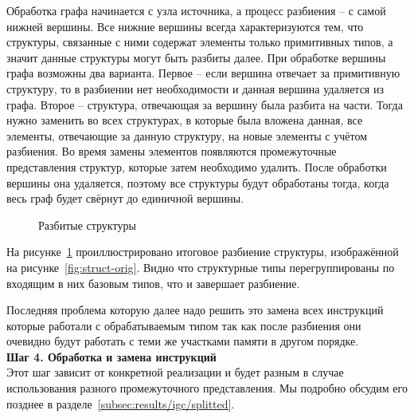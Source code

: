 Обработка графа начинается с узла источника, а процесс разбиения -- с самой нижней вершины. Все нижние вершины всегда характеризуются тем, что структуры, связанные с ними содержат элементы только примитивных типов, а значит данные структуры могут быть разбиты далее. При обработке вершины графа возможны два варианта.
Первое -- если вершина отвечает за примитивную структуру, то в разбиении нет необходимости и данная вершина удаляется из графа.
Второе -- структура, отвечающая за вершину была разбита на части. Тогда нужно заменить во всех структурах, в которые была вложена данная, все элементы, отвечающие за данную структуру, на новые элементы с учётом разбиения.
Во время замены элементов появляются промежуточные представления структур, которые затем необходимо удалить.
После обработки вершины она удаляется, поэтому все структуры будут обработаны тогда, когда весь граф будет свёрнут до единичной вершины.

\begin{figure}[ht]
    \caption{Разбитые структуры}\label{fig:struct-splitted}
\end{figure}

На рисунке~\cref{fig:struct-splitted} проиллюстрировано итоговое разбиение структуры, изображённой на рисунке~\cref{fig:struct-orig}.
Видно что структурные типы перегруппированы по входящим в них базовым типов, что и завершает разбиение.

Последняя проблема которую далее надо решить это замена всех инструкций которые работали с обрабатываемым типом так как после разбиения они очевидно будут работать с теми же участками памяти в другом порядке.\\

\textbf{Шаг 4. Обработка и замена инструкций}\\

Этот шаг зависит от конкретной реализации и будет разным в случае использования разного промежуточного представления. Мы подробно обсудим его позднее в разделе~\cref{subsec:results/igc/splitted}.

